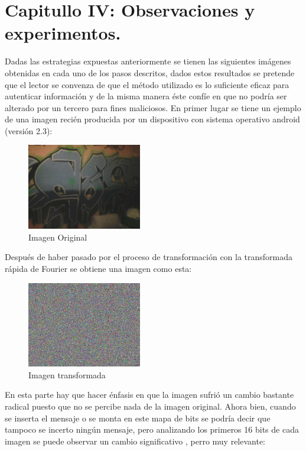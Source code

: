 \documentclass[12pt]{article}
\begin{document}
\section{Capitullo IV: Observaciones y experimentos.}
Dadas las estrategias expuestas anteriormente se tienen las siguientes imágenes obtenidas en cada uno de los pasos descritos, dados estos resultados  se pretende que el lector se convenza de que el método utilizado es lo suficiente eficaz para autenticar información y de la misma manera éste confíe en que no podría ser alterado por un tercero para fines maliciosos.
En primer lugar se tiene un ejemplo de una imagen recién producida por un  dispositivo con sistema operativo android (versión 2.3):
\newline
\begin{figure}[hbtp]
\centering
\includegraphics[width = 5cm]{chois0.png}
\caption{Imagen Original}
\end{figure}
\newline
Después de haber pasado por el proceso de transformación con la transformada rápida de Fourier se obtiene una imagen como esta:
\newline
\begin{figure}[hbtp]
\centering
\includegraphics[width = 5cm]{chois1.png}
\caption{Imagen transformada}
\end{figure}
\newline
En esta parte hay que hacer énfasis en que la imagen sufrió un cambio bastante radical puesto que no se percibe nada de la imagen original. Ahora bien, cuando se inserta el mensaje o se monta en este mapa de bits se podría decir que tampoco se incerto ningún mensaje, pero analizando los primeros 16 bits  de cada imagen se puede observar un cambio significativo , perro muy relevante:
\end{document}
